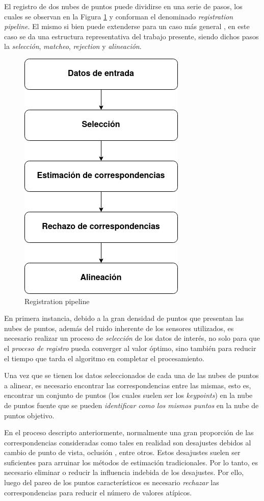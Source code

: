 El registro de dos nubes de puntos puede dividirse en una serie de pasos, los cuales se observan en la Figura \ref{fig:registrationpipeline} y conforman el denominado \textit{registration pipeline}. El mismo si bien puede extenderse para un caso más general \cite{garcia2017}, en este caso se da una estructura representativa del trabajo presente, siendo dichos pasos la \textit{selección}, \textit{matcheo}, \textit{rejection} y \textit{alineación}.

\begin{figure}[!ht]
    \centering
    \includegraphics[width=0.45\linewidth]{Img/3DRegistrationPipeline.png}
    \caption{Registration pipeline}
    \label{fig:registrationpipeline}
\end{figure}

En primera instancia, debido a la gran densidad de puntos que presentan las nubes de puntos, además del ruido inherente de los sensores utilizados, es necesario realizar un proceso de \textit{selección} de los datos de interés, no solo para que el \textit{proceso de registro} pueda converger al valor óptimo, sino también para reducir el tiempo que tarda el algoritmo en completar el procesamiento.

Una vez que se tienen los datos seleccionados de cada una de las nubes de puntos a alinear, es necesario encontrar las correspondencias entre las mismas, esto es, encontrar un conjunto de puntos (los cuales suelen ser los \textit{keypoints}) en la nube de puntos fuente que se pueden \textit{identificar como los mismos puntos} en la nube de puntos objetivo.

En el proceso descripto anteriormente, normalmente una gran proporción de las correspondencias consideradas como tales en realidad son desajustes debidos al cambio de punto de vista, oclusión \cite{barazzetti2018}, entre otros. Estos desajustes suelen ser suficientes para arruinar los métodos de estimación tradicionales. Por lo tanto, es necesario eliminar o reducir la influencia indebida de los desajustes. Por ello, luego del pareo de los puntos característicos es necesario \textit{rechazar} las correspondencias para reducir el número de valores atípicos.

